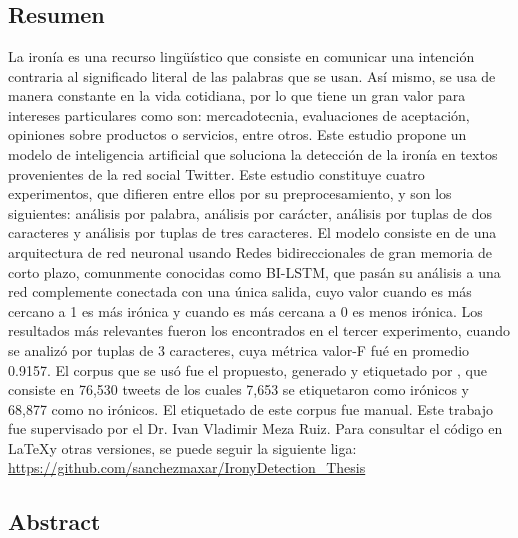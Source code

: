 \chapter*{}
\vspace*{-1.5cm}
{\let\clearpage\relax\section*{Resumen}}

\vspace*{-0.75cm}
\onehalfspacing
    \par La ironía es una recurso lingüístico que consiste en comunicar una intención contraria al significado literal de las palabras que se usan. Así mismo, se usa de manera constante en la vida cotidiana, por lo que tiene un gran valor para intereses particulares como son: mercadotecnia, evaluaciones de aceptación, opiniones sobre productos o servicios, entre otros. Este estudio propone un modelo de inteligencia artificial que soluciona la detección de la ironía en textos provenientes de la red social Twitter. Este estudio constituye cuatro experimentos, que difieren entre ellos por su preprocesamiento, y son los siguientes: análisis por palabra, análisis por carácter, análisis por tuplas de dos caracteres y análisis por tuplas de tres caracteres. El modelo consiste en de una arquitectura de red neuronal usando Redes bidireccionales de gran memoria de corto plazo, comunmente conocidas como BI-LSTM, que pasán su análisis a una red complemente conectada con una única salida, cuyo valor cuando es más cercano a 1 es más irónica y cuando es más cercana a 0 es menos irónica. Los resultados más relevantes fueron los encontrados en el tercer experimento, cuando se analizó por tuplas de 3 caracteres, cuya métrica valor-F fué en promedio 0.9157. El corpus que se usó fue el propuesto, generado y etiquetado por \textcite{lopez2016character}, que consiste en 76,530 tweets de los cuales 7,653 se etiquetaron como irónicos y 68,877 como no irónicos. El etiquetado de este corpus fue manual. Este trabajo fue supervisado por el Dr. Ivan Vladimir Meza Ruiz. Para consultar el código en \LaTeX y otras versiones, se puede seguir la siguiente liga: \url{https://github.com/sanchezmaxar/IronyDetection_Thesis}

    \vspace*{-1cm}
{\let\clearpage\relax\section*{Abstract}}
\onehalfspacing
\vspace*{-0.75cm}

